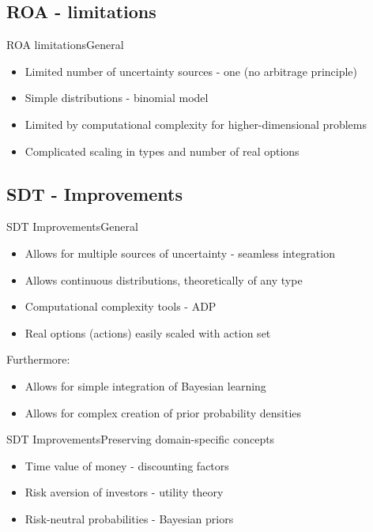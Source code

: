 \documentclass[us]{beamer}
\begin{document}
\subsection{ROA - limitations}

\begin{frame}{ROA limitations}{General}
	\begin{itemize}
		\item {Limited number of uncertainty sources - one (no arbitrage principle)}
		\item {Simple distributions - binomial model}
		\item {Limited by computational complexity for higher-dimensional problems}
		\item {Complicated scaling in types and number of real options}
	\end{itemize}
\end{frame}

\subsection{SDT - Improvements}

\begin{frame}{SDT Improvements}{General}
	\begin{itemize}
		\item {Allows for multiple sources of uncertainty - seamless integration}
		\item {Allows continuous distributions, theoretically of any type}
		\item {Computational complexity tools - ADP}
		\item {Real options (actions) easily scaled with action set}
	\end{itemize}

	Furthermore: 
	\begin{itemize}
		\item{Allows for simple integration of Bayesian learning}
		\item{Allows for complex creation of prior probability densities}
	\end{itemize}
\end{frame}

\begin{frame}{SDT Improvements}{Preserving domain-specific concepts}
	\begin{itemize}
		\item {Time value of money - discounting factors}
		\item {Risk aversion of investors - utility theory }
		\item {Risk-neutral probabilities - Bayesian priors}
	\end{itemize}
\end{frame}
\end{document}
